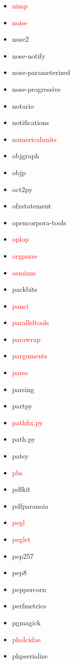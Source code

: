 \documentclass{l4proj}
\begin{document}
\begin{appendices}
{\begin{itemize}
\item\textcolor{red}{nimp}
\item\textcolor{red}{noise}
\item nose2
\item nose-notify
\item nose-parameterized
\item nose-progressive
\item notario
\item notifications
\item\textcolor{red}{numericalunits}
\item objgraph
\item objp
\item oct2py
\item ofxstatement
\end{itemize}
}%
\clearpage
\noindent\parbox[t]{0.32\textwidth}{\raggedright%
\begin{itemize}
\item opencorpora-tools
\item\textcolor{red}{oplop}
\item\textcolor{red}{orgparse}
\item\textcolor{red}{osmium}
\item packbits
\item\textcolor{red}{panci}
\item\textcolor{red}{paralleltools}
\item\textcolor{red}{parawrap}
\item\textcolor{red}{parguments}
\item\textcolor{red}{parse}
\item parsing
\item partpy
\item\textcolor{red}{pathfix.py}
\item path.py
\item patsy
\item\textcolor{red}{pbs}
\item pdfkit
\item pdfparanoia
\item\textcolor{red}{pegl}
\item\textcolor{red}{peglet}
\item pep257
\item pep8
\item peppercorn
\item perfmetrics
\item pgmagick
\item\textcolor{red}{pholcidae}
\item phpserialize

\end{itemize}}
\end{appendices}
\end{document}
